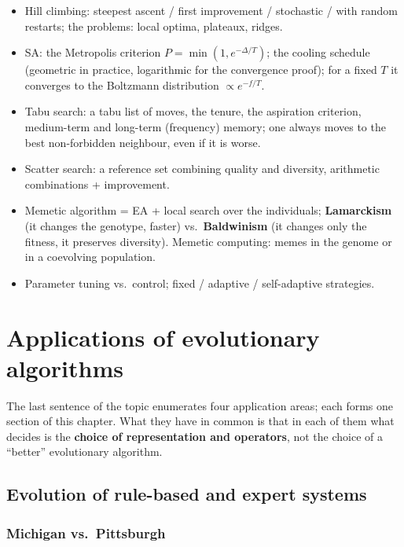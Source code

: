 \documentclass[11pt,a4paper]{article}
\theoremstyle{definition}
\providecommand{\uv}[1]{``#1''}
\begin{document}
\begin{itemize}
\item Hill climbing: steepest ascent / first improvement / stochastic / with
  random restarts; the problems: local optima, plateaux, ridges.
\item SA: the Metropolis criterion $P = \min(1, e^{-\Delta/T})$; the cooling
  schedule (geometric in practice, logarithmic for the convergence proof); for a
  fixed $T$ it converges to the Boltzmann distribution $\propto e^{-f/T}$.
\item Tabu search: a tabu list of moves, the tenure, the aspiration criterion,
  medium-term and long-term (frequency) memory; one always moves to the best
  non-forbidden neighbour, even if it is worse.
\item Scatter search: a reference set combining quality and diversity,
  arithmetic combinations + improvement.
\item Memetic algorithm = EA + local search over the individuals;
  \textbf{Lamarckism} (it changes the genotype, faster) vs.\
  \textbf{Baldwinism} (it changes only the fitness, it preserves diversity).
  Memetic computing: memes in the genome or in a coevolving population.
\item Parameter tuning vs.\ control; fixed / adaptive / self-adaptive
  strategies.
\end{itemize}


\section{Applications of evolutionary algorithms}
\label{sec:aplikace}

The last sentence of the topic enumerates four application areas; each forms one section of
this chapter. What they have in common is that in each of them what decides is the
\textbf{choice of representation and operators}, not the choice of a \uv{better}
evolutionary algorithm.

\subsection{Evolution of rule-based and expert systems}
\label{sec:lcs}

\subsubsection{Michigan vs.\ Pittsburgh}
\end{document}
